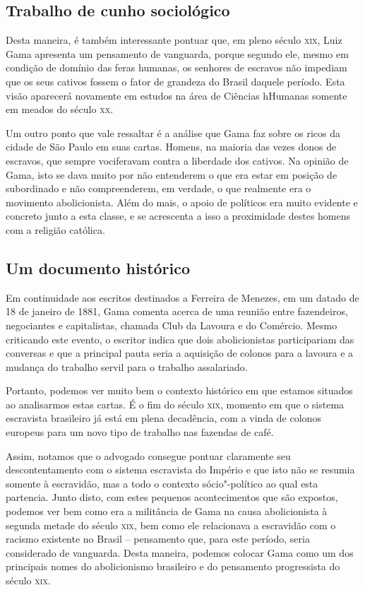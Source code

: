 \documentclass[12pt]{extarticle}
\begin{document}


\subsection{Trabalho de cunho sociológico}

Desta maneira, é também interessante pontuar que, em pleno século \textsc{xix},
Luiz Gama apresenta um pensamento de vanguarda, porque segundo ele,
mesmo em condição de domínio das feras humanas, os senhores de escravos
não impediam que os seus cativos fossem o fator de grandeza do Brasil
daquele período. Esta visão aparecerá novamente em estudos na
área de Ciências hHumanas somente em meados do século \textsc{xx}.

Um outro ponto que vale ressaltar é a análise que Gama faz sobre
os ricos da cidade de São Paulo em suas cartas. Homens, na maioria
das vezes donos de escravos, que sempre vociferavam contra a liberdade
dos cativos. Na opinião de Gama, isto se dava muito por não entenderem o
que era estar em posição de subordinado e não compreenderem, em verdade,
o que realmente era o movimento abolicionista. Além do mais, o apoio de
políticos era muito evidente e concreto junto a esta classe, e se
acrescenta a isso a proximidade destes homens com a religião católica.

\subsection{Um documento histórico}

Em continuidade aos escritos destinados a Ferreira de Menezes, em um datado
de 18 de janeiro de 1881, Gama comenta acerca de uma reunião entre
fazendeiros, negociantes e capitalistas, chamada Club da Lavoura e do
Comércio. Mesmo criticando este evento, o escritor indica que dois
abolicionistas participariam das conversas e que a principal pauta seria
a aquisição de colonos para a lavoura e a mudança do trabalho servil
para o trabalho assalariado.

Portanto, podemos ver muito bem o contexto histórico em que estamos
situados ao analisarmos estas cartas. É o fim do século \textsc{xix}, momento em
que o sistema escravista brasileiro já está em plena decadência, com a
vinda de colonos europeus para um novo tipo de trabalho nas fazendas de
café.

Assim, notamos que o advogado consegue pontuar claramente seu
descontentamento com o sistema escravista do Império e que isto não se
resumia somente à escravidão, mas a todo o contexto sócio"-político ao qual
esta partencia. Junto disto, com estes pequenos acontecimentos que são
expostos, podemos ver bem como era a militância de Gama na causa abolicionista
à segunda metade do século \textsc{xix}, bem como ele relacionava a
escravidão com o racismo existente no Brasil -- pensamento que, para este
período, seria considerado de vanguarda. Desta maneira, podemos colocar
Gama como um dos principais nomes do abolicionismo brasileiro e do
pensamento progressista do século \textsc{xix}.
\end{document}
